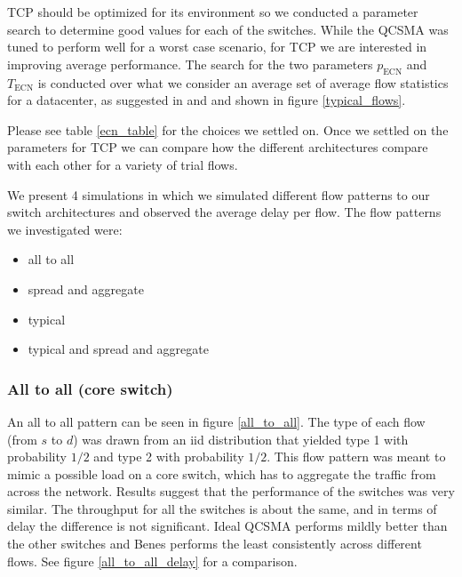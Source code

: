 \documentclass{IEEEtran}%
\begin{document}
  TCP should be optimized for its environment so we conducted a parameter search to determine good values for each of the switches.  While the QCSMA was tuned to perform well for a worst case scenario, for TCP we are interested in improving average performance.  The search for the two parameters $p_{\text{ECN}}$ and $T_{\text{ECN}}$ is conducted over what we consider an average set of average flow statistics for a datacenter, as suggested in \cite{Benson} and \cite{Kandula} and shown in figure \ref{typical_flows}.

Please see table \ref{ecn_table} for the choices we settled on.  Once we settled on the parameters for TCP we can compare how the different architectures compare with each other for a variety of trial flows.  


We present 4 simulations in which we simulated different flow patterns to our switch architectures and observed the average delay per flow.  The flow patterns we investigated were:

\begin{itemize}
\item all to all 
\item spread and aggregate 
\item typical 
\item typical and spread and aggregate \\
\end{itemize}

\subsubsection{All to all (core switch)}
An all to all pattern can be seen in figure \ref{all_to_all}.  The type of each flow (from $s$ to $d$) was drawn from an iid distribution that yielded type 1 with probability $1/2$ and type 2 with probability $1/2$.  This flow pattern was meant to mimic a possible load on a core switch, which has to aggregate the traffic from across the network.  Results suggest that the performance of the switches was very similar.  The throughput for all the switches is about the same, and in terms of delay the difference is not significant. Ideal QCSMA performs mildly better than the other switches and Benes performs the least consistently across different flows.  See figure \ref{all_to_all_delay} for a comparison.
\end{document}
